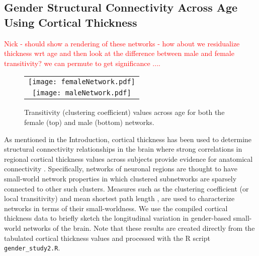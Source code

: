 \subsection{Gender Structural Connectivity Across Age Using Cortical Thickness}

\textcolor{red}{ Nick - should show a rendering of these networks -
  how about we residualize thickness wrt age and then look at the
  difference between male and female transitivity?  we can permute to
  get significance .... } 

\begin{figure*}
  \centering
  \begin{tabular}{c}
  \texttt{[image: femaleNetwork.pdf]} \\
  \texttt{[image: maleNetwork.pdf]}
  \end{tabular}
  \caption{Transitivity (clustering coefficient) values across age for both the female (top)
  and male (bottom) networks.  
  }
  \label{fig:network}
\end{figure*}

As mentioned in the Introduction, cortical thickness has
been used to determine structural connectivity relationships in the brain 
where strong correlations in regional cortical 
thickness values across subjects provide evidence for anatomical
connectivity \citep{he2007,chen2008,he2008}.  Specifically, networks of neuronal
regions are thought to have small-world network properties \citep{sporns2004} 
in which clustered subnetworks are sparsely connected to other such clusters.
Measures such as the
clustering coefficient (or local transitivity) and mean shortest path length
\citep{watts1998}, are used to characterize networks in terms of their 
small-worldness.
We use the compiled cortical thickness data to briefly sketch
the longitudinal variation in gender-based small-world networks of the
brain.  Note that these results are created directly from the tabulated 
cortical thickness values and processed with the R script
\verb#gender_study2.R#.

